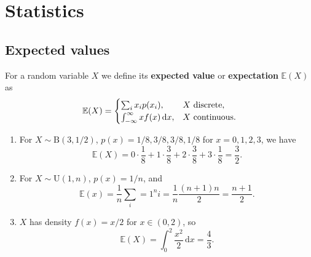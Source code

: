 \documentclass[letter-paper]{tufte-book}
\newenvironment{example}[1][Example]{\begin{trivlist}
\item[\hskip \labelsep {\bfseries #1}]}{\end{trivlist}}
\newcommand\Def[1]{\textbf{#1}}
\begin{document}

\section{Statistics}


\subsection{Expected values}

For a random variable $X$ we define its \Def{expected value} or
\Def{expectation} $\mathbb{E}(X)$ as
\begin{equation*}
  \mathbb{E}(X) =
    \begin{cases}
      \sum_i x_i p(x_i), & X\ \textnormal{discrete},\\
      \int_{-\infty}^\infty x f(x)\, \mathrm{d}x, & X\ \textnormal{continuous}.
    \end{cases}
\end{equation*}

\begin{example}
  \begin{enumerate}
    \item For $X\sim \mbox{B}(3,1/2)$, $p(x)=1/8,3/8,3/8,1/8$ for $x=0,1,2,3$,
    we have
    \begin{equation*}
      \mathbb{E}(X) = 0\cdot\frac{1}{8} + 1\cdot\frac{3}{8}
        + 2\cdot\frac{3}{8} + 3\cdot\frac{1}{8} = \frac{3}{2}.
    \end{equation*}
    
    \item For $X\sim\mbox{U}(1,n)$, $p(x) = 1/n$, and
    \begin{equation*}
      \mathbb{E}(x) = \frac{1}{n} \sum_i=1^n i = \frac{1}{n}\frac{(n+1)n}{2}
        = \frac{n+1}{2}.
    \end{equation*}
    
    \item $X$ has density $f(x) = x/2$ for $x\in(0,2)$, so
    \begin{equation*}
      \mathbb{E}(X) = \int_0^2 \frac{x^2}{2}\, \mathrm{d}x = \frac{4}{3}.
    \end{equation*}
  \end{enumerate}
\end{example}
\end{document}
